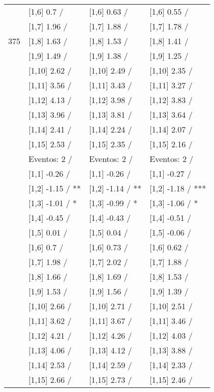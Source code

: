 \begin{table}
\begin{tabular}[t]{llll}
 & {}[1,6] 0.7  / & {}[1,6] 0.63  / & {}[1,6] 0.55  /\\
 & {}[1,7] 1.96  / & {}[1,7] 1.88  / & {}[1,7] 1.78  /\\
375 & {}[1,8] 1.63  / & {}[1,8] 1.53  / & {}[1,8] 1.41  /\\
\addlinespace
 & {}[1,9] 1.49  / & {}[1,9] 1.38  / & {}[1,9] 1.25  /\\
 & {}[1,10] 2.62  / & {}[1,10] 2.49  / & {}[1,10] 2.35  /\\
 & {}[1,11] 3.56  / & {}[1,11] 3.43  / & {}[1,11] 3.27  /\\
 & {}[1,12] 4.13  / & {}[1,12] 3.98  / & {}[1,12] 3.83  /\\
 & {}[1,13] 3.96  / & {}[1,13] 3.81  / & {}[1,13] 3.64  /\\
\addlinespace
 & {}[1,14] 2.41  / & {}[1,14] 2.24  / & {}[1,14] 2.07  /\\
 & {}[1,15] 2.53  / & {}[1,15] 2.35  / & {}[1,15] 2.16  /\\
 & Eventos:  2 / & Eventos:  2 / & Eventos:  2 /\\
 & {}[1,1] -0.26  / & {}[1,1] -0.26  / & {}[1,1] -0.27  /\\
 & {}[1,2] -1.15  / ** & {}[1,2] -1.14  / ** & {}[1,2] -1.18  / ***\\
\addlinespace
 & {}[1,3] -1.01  / * & {}[1,3] -0.99  / * & {}[1,3] -1.06  / *\\
 & {}[1,4] -0.45  / & {}[1,4] -0.43  / & {}[1,4] -0.51  /\\
 & {}[1,5] 0.01  / & {}[1,5] 0.04  / & {}[1,5] -0.06  /\\
 & {}[1,6] 0.7  / & {}[1,6] 0.73  / & {}[1,6] 0.62  /\\
 & {}[1,7] 1.98  / & {}[1,7] 2.02  / & {}[1,7] 1.88  /\\
\addlinespace
500 & {}[1,8] 1.66  / & {}[1,8] 1.69  / & {}[1,8] 1.53  /\\
 & {}[1,9] 1.53  / & {}[1,9] 1.56  / & {}[1,9] 1.39  /\\
 & {}[1,10] 2.66  / & {}[1,10] 2.71  / & {}[1,10] 2.51  /\\
 & {}[1,11] 3.62  / & {}[1,11] 3.67  / & {}[1,11] 3.46  /\\
 & {}[1,12] 4.21  / & {}[1,12] 4.26  / & {}[1,12] 4.03  /\\
\addlinespace
 & {}[1,13] 4.06  / & {}[1,13] 4.12  / & {}[1,13] 3.88  /\\
 & {}[1,14] 2.53  / & {}[1,14] 2.59  / & {}[1,14] 2.33  /\\
 & {}[1,15] 2.66  / & {}[1,15] 2.73  / & {}[1,15] 2.46  /\\
\bottomrule
\end{tabular}
\end{table}
